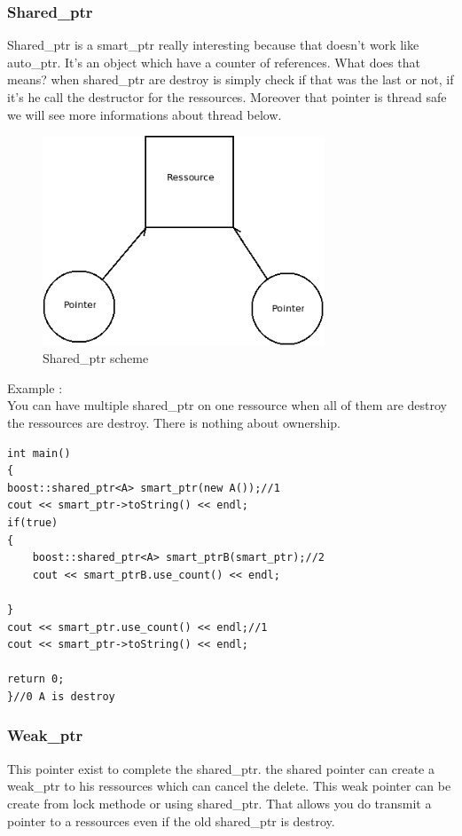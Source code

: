 \documentclass[a4paper,11pt]{report}
\begin{document}
\subsubsection{Shared\_ptr}
Shared\_ptr is a smart\_ptr really interesting because that doesn't work like auto\_ptr.
It's an object which have a counter of references. What does that means? %
when shared\_ptr are destroy is simply check if that was the last or not, if it's he call the destructor for the ressources.
Moreover that pointer is thread safe we will see more informations about thread below. \\

\begin{figure}
	\center
	\includegraphics[width=0.75\textwidth]{Shared_ptr.png}
	\caption{Shared\_ptr scheme}
\end{figure}
\newpage
Example :\\
You can have multiple shared\_ptr on one ressource when all of them are destroy the ressources are destroy. There is nothing about ownership.
\begin{verbatim}
int main()
{
boost::shared_ptr<A> smart_ptr(new A());//1
cout << smart_ptr->toString() << endl;
if(true)
{
	boost::shared_ptr<A> smart_ptrB(smart_ptr);//2
	cout << smart_ptrB.use_count() << endl;

}
cout << smart_ptr.use_count() << endl;//1
cout << smart_ptr->toString() << endl;

return 0;
}//0 A is destroy 
\end{verbatim}

\subsubsection{Weak\_ptr}
This pointer exist to complete the shared\_ptr.
the shared pointer can create a weak\_ptr to his ressources which can cancel the delete.
This weak pointer can be create from lock methode or using shared\_ptr.
That allows you do transmit a pointer to a ressources even if the old shared\_ptr is destroy.
\end{document}
